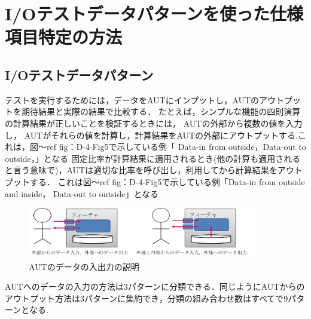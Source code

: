 \documentclass[a4paper,12pt]{jreport}
\begin{document}
\section{I/Oテストデータパターンを使った仕様項目特定の方法}

\subsection{I/Oテストデータパターン}

テストを実行するためには，データをAUTにインプットし，AUTのアウトプットを期待結果と実際の結果で比較する．
たとえば，シンプルな機能の四則演算の計算結果が正しいことを検証するときには， AUTの外部から複数の値を入力し， AUTがそれらの値を計算し，計算結果をAUTの外部にアウトプットする.これは，図〜ref {fig：D-4-Fig5}で示している例「 Data-in from outside，Data-out to outside，」となる
固定比率が計算結果に適用されるとき(他の計算も適用されると言う意味で)，AUTは適切な比率を呼び出し，利用してから計算結果をアウトプットする．
これは図〜ref {fig：D-4-Fig5}で示している例「Data-in from outside and inside， Data-out to outside」となる
 \begin{figure}[htbp]
  \begin{center}
  \includegraphics[width=10cm]{./image/D-3-Fig4.png}
  \caption{AUTのデータの入出力の説明}
  \label{fig:D-4-Fig5}
  \end{center}
   \end{figure}



AUTへのデータの入力の方法は3パターンに分類できる．同じようにAUTからのアウトプット方法は3パターンに集約でき，分類の組み合わせ数はすべてで9パターンとなる.
\end{document}
